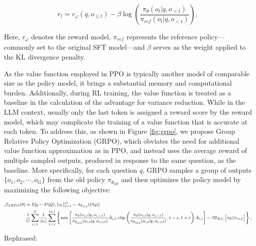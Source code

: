\begin{itemize}[topsep=0pt]
\begin{itemize}[topsep=0pt]
\begin{equation}
    r_{t} = r_\varphi(q, o_{\le t}) - \beta \log\left(\frac{\pi_{\theta}(o_{t}|q, o_{<t})}{\pi_{ref}(o_{t}|q, o_{<t})}\right),
\label{eq:PPO-reward}
\end{equation}

Here, $r_\varphi$ denotes the reward model, $\pi_{ref}$ represents the reference policy—commonly set to the original SFT model—and $\beta$ serves as the weight applied to the KL divergence penalty.

As the value function employed in PPO is typically another model of comparable size as the policy model, it brings a substantial memory and computational burden. Additionally, during RL training, the value function is treated as a baseline in the calculation of the advantage for variance reduction. While in the LLM context, usually only the last token is assigned a reward score by the reward model, which may complicate the training of a value function that is accurate at each token. To address this, as shown in Figure \ref{fig:grpo}, we propose Group Relative Policy Optimization (GRPO), which obviates the need for additional value function approximation as in PPO, and instead uses the average reward of multiple sampled outputs, produced in response to the same question, as the baseline. More specifically, for each question $q$, GRPO samples a group of outputs $\{o_1, o_2, \cdots, o_G\}$  from the old policy  $\pi_{\theta_{old}}$  and then optimizes the policy model by maximizing the following objective:

\begin{equation}
\footnotesize
\begin{split}
    \mathcal{J}_{GRPO}(\theta) &= \mathbb{E}{[q \sim P(Q), \{o_i\}_{i=1}^G \sim \pi_{\theta_{old}}(O|q)]}  \\
    & \frac{1}{G}\sum_{i=1}^G\frac{1}{|o_i|} \sum_{t=1}^{|o_i|} \left\{ \min \left[ \frac{\pi_\theta(o_{i,t} | q, o_{i,<t})}{\pi_{\theta_{old}}(o_{i,t} | q, o_{i,<t})} \hat{A}_{i,t}, \text{clip} \left( \frac{\pi_\theta(o_{i,t} | q, o_{i,<t})}{\pi_{\theta_{old}}(o_{i,t} | q, o_{i,<t})}, 1 - \varepsilon, 1 + \varepsilon \right)  \hat{A}_{i,t} \right] - \beta \mathbb{D}_{KL}\left[\pi_{\theta} || \pi_{ref}\right]\right\} ,
\end{split}
\label{eq:GRPO-obj}
\end{equation}

Rephrased:


\end{itemize}
\end{itemize}
